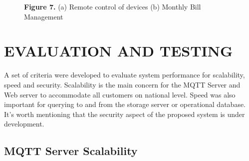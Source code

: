 \documentclass[a4paper,12pt,oneside]{article}
\let\counterwithin\relax
\begin{document}
\begin{itemize}
\begin{figure}[H]
        \centering
        \caption{\textbf{Figure 7.} (a) Remote control of devices \hspace{2ex} (b) Monthly Bill Management}
        \end{figure}
\end{itemize}

\newpage
\section{EVALUATION AND TESTING}
A set of criteria were developed to evaluate system
performance for scalability, speed and security. Scalability is
the main concern for the MQTT Server and Web server to
accommodate all customers on national level. Speed was also
important for querying to and from the storage server or
operational database. It’s worth mentioning that the security
aspect of the proposed system is under development.

\subsection{MQTT Server Scalability}
\end{document}
